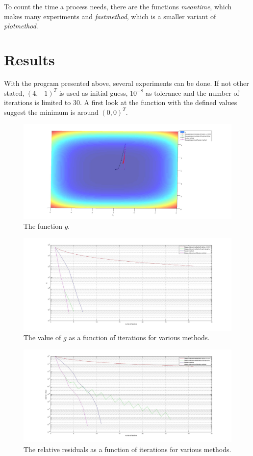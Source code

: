 \documentclass[a4paper,12pt]{article}
\newcommand{\code}[1]{\textit{#1}}
\begin{document}
To count the time a process needs, there are the functions \code{meantime}, which makes many experiments and \code{fastmethod}, which is a smaller variant of \code{plotmethod}.

\section{Results}
With the program presented above, several experiments can be done.
If not other stated, $(4,-1)^T$ is used as initial guess, $10^{-8}$ as tolerance and the number of iterations is limited to $30$.
A first look at the function with the defined values suggest the minimum is around $(0,0)^T$.
\begin{figure}[h]\label{g}
	\includegraphics[width=\textwidth]{g.jpg}
	\caption{The function $g$.}
\end{figure}
\begin{figure}\label{gvalue}
	\includegraphics[width=\textwidth]{gvalues.jpg}
	\caption{The value of $g$ as a function of iterations for various methods.}
\end{figure}
\begin{figure}\label{res}
	\includegraphics[width=\textwidth]{res.jpg}
	\caption{The relative residuals as a function of iterations for various methods.}
\end{figure}
\end{document}
